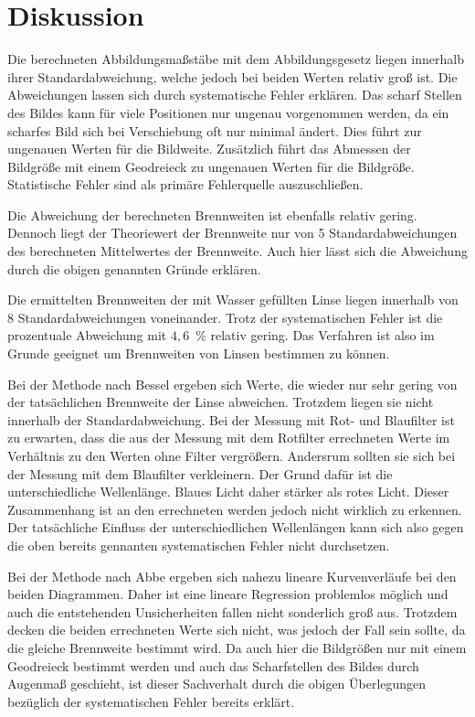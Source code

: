 \section{Diskussion}
\label{sec:Diskussion}
Die berechneten Abbildungsmaßstäbe mit dem Abbildungsgesetz liegen innerhalb ihrer Standardabweichung, welche
jedoch bei beiden Werten relativ groß ist. Die Abweichungen lassen sich durch systematische Fehler erklären.
Das scharf Stellen des Bildes kann für viele Positionen nur ungenau vorgenommen werden, da ein
scharfes Bild sich bei Verschiebung oft nur minimal ändert. Dies führt zur ungenauen Werten für die Bildweite.
Zusätzlich führt das Abmessen der Bildgröße mit einem Geodreieck zu ungenauen Werten für die Bildgröße.
Statistische Fehler sind als primäre Fehlerquelle auszuschließen.

Die Abweichung der berechneten Brennweiten ist ebenfalls relativ gering. Dennoch liegt der
Theoriewert der Brennweite nur von 5 Standardabweichungen des berechneten Mittelwertes der Brennweite. Auch hier lässt
sich die Abweichung durch die obigen genannten Gründe erklären.

Die ermittelten Brennweiten der mit Wasser gefüllten Linse liegen innerhalb von 8 Standardabweichungen voneinander.
Trotz der systematischen Fehler ist die prozentuale Abweichung mit $4,6$\, \% relativ gering.
Das Verfahren ist also im Grunde geeignet um Brennweiten von Linsen bestimmen zu können.


Bei der Methode nach Bessel ergeben sich Werte, die wieder nur sehr gering von der tatsächlichen Brennweite der
Linse abweichen. Trotzdem liegen sie nicht innerhalb der Standardabweichung.
Bei der Messung mit Rot- und Blaufilter ist zu erwarten, dass die aus der Messung mit dem Rotfilter errechneten Werte
im Verhältnis zu den Werten ohne Filter vergrößern. Andersrum sollten sie sich bei der Messung mit dem Blaufilter verkleinern.
Der Grund dafür ist die unterschiedliche Wellenlänge. Blaues Licht daher stärker als rotes Licht. Dieser Zusammenhang ist
an den errechneten werden jedoch nicht wirklich zu erkennen. Der tatsächliche Einfluss der unterschiedlichen Wellenlängen
kann sich also gegen die oben bereits gennanten systematischen Fehler nicht durchsetzen.

Bei der Methode nach Abbe ergeben sich nahezu lineare Kurvenverläufe bei den beiden Diagrammen. Daher ist eine
lineare Regression problemlos möglich und auch die entstehenden Unsicherheiten fallen nicht sonderlich groß aus.
Trotzdem decken die beiden errechneten Werte sich nicht, was jedoch der Fall sein sollte, da die gleiche Brennweite
bestimmt wird. Da auch hier die Bildgrößen nur mit einem Geodreieck bestimmt werden und auch das Scharfstellen des Bildes
durch Augenmaß geschieht, ist dieser Sachverhalt durch die obigen Überlegungen bezüglich der systematischen Fehler
bereits erklärt.
